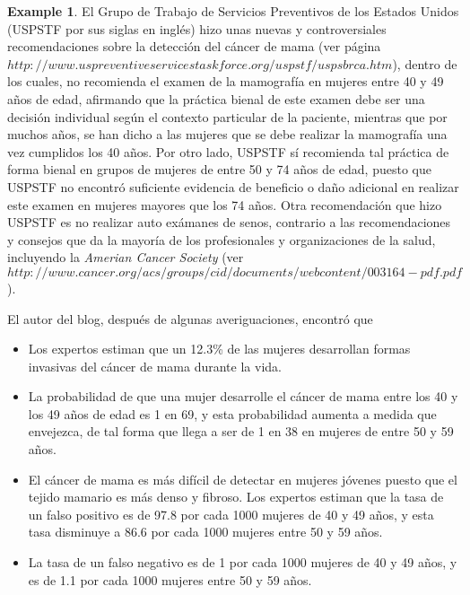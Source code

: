 \documentclass[
  spanish,
  letter]{book}
\providecommand{\tightlist}{%
  \setlength{\itemsep}{0pt}\setlength{\parskip}{0pt}}
\theoremstyle{definition}
\theoremstyle{definition}
\newtheorem{example}{Example}[chapter]
\theoremstyle{definition}
\theoremstyle{remark}
\begin{document}
\begin{example}
\protect\hypertarget{exm:unnamed-chunk-15}{}{\label{exm:unnamed-chunk-15} }El Grupo de Trabajo de Servicios Preventivos de los Estados Unidos (USPSTF por sus siglas en inglés) hizo unas nuevas y controversiales recomendaciones sobre la detección del cáncer de mama (ver página \(http://www.uspreventiveservicestaskforce.org/uspstf/uspsbrca.htm\)), dentro de los cuales, no recomienda el examen de la mamografía en mujeres entre 40 y 49 años de edad, afirmando que la práctica bienal de este examen debe ser una decisión individual según el contexto particular de la paciente, mientras que por muchos años, se han dicho a las mujeres que se debe realizar la mamografía una vez cumplidos los 40 años. Por otro lado, USPSTF sí recomienda tal práctica de forma bienal en grupos de mujeres de entre 50 y 74 años de edad, puesto que USPSTF no encontró suficiente evidencia de beneficio o daño adicional en realizar este examen en mujeres mayores que los 74 años. Otra recomendación que hizo USPSTF es no realizar auto exámanes de senos, contrario a las recomendaciones y consejos que da la mayoría de los profesionales y organizaciones de la salud, incluyendo la \emph{Amerian Cancer Society} (ver \(http://www.cancer.org/acs/groups/cid/documents/webcontent/003164-pdf.pdf\)).

El autor del blog, después de algunas averiguaciones, encontró que

\begin{itemize}
\tightlist
\item
  Los expertos estiman que un 12.3\% de las mujeres desarrollan formas invasivas del cáncer de mama durante la vida.
\item
  La probabilidad de que una mujer desarrolle el cáncer de mama entre los 40 y los 49 años de edad es 1 en 69, y esta probabilidad aumenta a medida que envejezca, de tal forma que llega a ser de 1 en 38 en mujeres de entre 50 y 59 años.
\item
  El cáncer de mama es más difícil de detectar en mujeres jóvenes puesto que el tejido mamario es más denso y fibroso. Los expertos estiman que la tasa de un falso positivo es de 97.8 por cada 1000 mujeres de 40 y 49 años, y esta tasa disminuye a 86.6 por cada 1000 mujeres entre 50 y 59 años.
\item
  La tasa de un falso negativo es de 1 por cada 1000 mujeres de 40 y 49 años, y es de 1.1 por cada 1000 mujeres entre 50 y 59 años.
\end{itemize}


\end{example}
\end{document}
